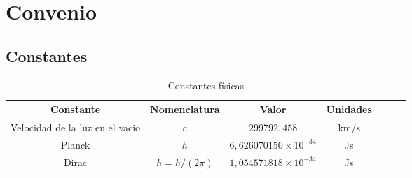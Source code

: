 \chapter[Convenio]{Convenio}
\section{Constantes}\label{sec:constantes}
\begin{table}[htbp]
    \caption{Constantes físicas\label{tab:constantes_fisicas}}
    \centering
    \begin{tabular}{ccccccc}
        \toprule
        Constante & Nomenclatura & Valor & Unidades\\
        \midrule
        Velocidad de la luz en el vacio & $c$ & $299792,458$ & km/s\\
        Planck & $h$ & $6,626070150 \times 10^{-34}$ & Js\\
        Dirac & $\hbar=h/(2\pi)$ & $1,054571818\times 10^{-34}$ & Js\\
        \bottomrule
    \end{tabular}
\end{table}
